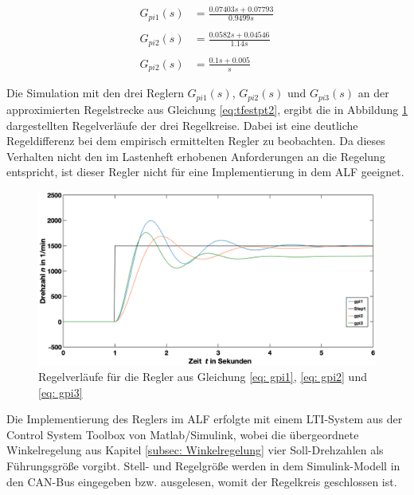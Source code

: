 			\begin{align}
			\label{eq: gpi1}
			G_{pi1}(s) &= \frac{0.07403s+0.07793}{0.9499s}\\\nonumber\\
			\label{eq: gpi2}
			G_{pi2}(s) &= \frac{0.0582s+0.04546}{1.14s}\\\nonumber\\
			\label{eq: gpi3}
			G_{pi2}(s) &= \frac{0.1s+0.005}{s}
			\end{align}
		
	
			Die Simulation mit den drei Reglern $G_{pi1}(s)$, $G_{pi2}(s)$ und $G_{pi3}(s)$ an der approximierten Regelstrecke aus Gleichung \ref{eq:tfestpt2}, ergibt die in Abbildung \ref{fig: simulation_regler} dargestellten Regelverläufe der drei Regelkreise. Dabei ist eine deutliche Regeldifferenz bei dem empirisch ermittelten Regler zu beobachten. Da dieses Verhalten nicht den im Lastenheft erhobenen Anforderungen an die Regelung entspricht, ist dieser Regler nicht für eine Implementierung in dem ALF geeignet.

					\begin{figure}[H]
				 	\centering
				 	\includegraphics[width=1.0\textwidth]{Bilder/simulation_regler.png}
				 	\caption{Regelverläufe für die Regler aus Gleichung \ref{eq: gpi1}, \ref{eq: gpi2} und \ref{eq: gpi3}}
				 	\label{fig: simulation_regler}
				 	\end{figure} 
			
			Die Implementierung des Reglers im ALF erfolgte mit einem LTI-System aus der Control System Toolbox von Matlab/Simulink, wobei die übergeordnete Winkelregelung aus Kapitel \ref{subsec: Winkelregelung} vier Soll-Drehzahlen als Führungsgröße vorgibt. Stell- und Regelgröße werden in dem Simulink-Modell in den CAN-Bus eingegeben bzw. ausgelesen, womit der Regelkreis geschlossen ist.\\
			
